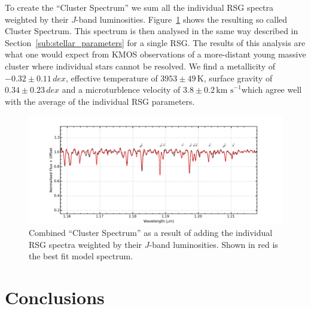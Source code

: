 \documentclass[useAMS,usenatbib]{mn2e}
\def\kms{$\mbox{km s}^{-1}$}
\begin{document}

To create the ``Cluster Spectrum'' we sum all the individual RSG spectra weighted by their $J$-band luminosities.
Figure~\ref{fig:clusterspec} shows the resulting so called Cluster Spectrum.
This spectrum is then analysed in the same way described in Section~\ref{sub:stellar_parameters} for a single RSG.
The results of this analysis are what one would expect from KMOS observations of a more-distant young massive cluster where individual stars cannot be resolved.
We find a metallicity of $-0.32\pm0.11\,dex$, effective temperature of $3953\pm49\,$K, surface gravity of $0.34\pm0.23\,dex$ and a microturblence velocity of $3.8\pm0.2\,$\kms which agree well with the average of the individual RSG parameters.

\begin{figure}
 \includegraphics[width=16.0cm]{NGC2100-clusterspec}
 \caption{Combined ``Cluster Spectrum'' as a result of adding the individual RSG spectra weighted by their $J$-band luminosities. Shown in red is the best fit model spectrum.
\label{fig:clusterspec}
          }
\end{figure}



\section{Conclusions} %
\label{sec:conclusions}
\end{document}
